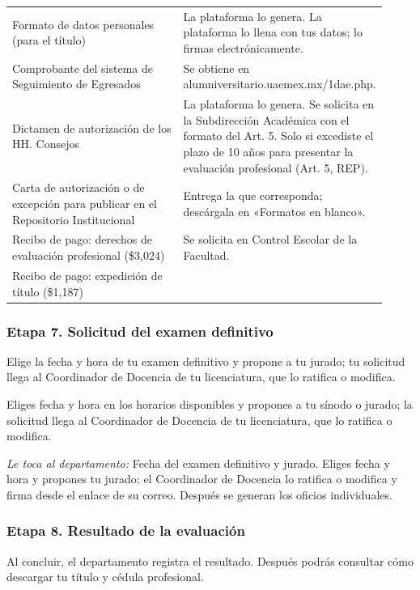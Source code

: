 {\begin{longtable}{>{\raggedright\arraybackslash}p{0.47\linewidth}>{\raggedright\arraybackslash}p{0.45\linewidth}}
Formato de datos personales (para el título) & La plataforma lo genera. La plataforma lo llena con tus datos; lo firmas electrónicamente.\\
Comprobante del sistema de Seguimiento de Egresados & Se obtiene en alumniversitario.uaemex.mx/1dae.php.\\
Dictamen de autorización de los HH. Consejos & La plataforma lo genera. Se solicita en la Subdirección Académica con el formato del Art. 5. Solo si excediste el plazo de 10 años para presentar la evaluación profesional (Art. 5, REP).\\
Carta de autorización o de excepción para publicar en el Repositorio Institucional & Entrega la que corresponda; descárgala en «Formatos en blanco».\\
Recibo de pago: derechos de evaluación profesional (\$3,024) & Se solicita en Control Escolar de la Facultad.\\
Recibo de pago: expedición de título (\$1,187) & \\
\bottomrule
\end{longtable}}
\subsubsection*{Etapa 7. Solicitud del examen definitivo}
Elige la fecha y hora de tu examen definitivo y propone a tu jurado; tu solicitud llega al Coordinador de Docencia de tu licenciatura, que lo ratifica o modifica.

Eliges fecha y hora en los horarios disponibles y propones a tu sínodo o jurado; la solicitud llega al Coordinador de Docencia de tu licenciatura, que lo ratifica o modifica.

\emph{Le toca al departamento:} Fecha del examen definitivo y jurado. Eliges fecha y hora y propones tu jurado; el Coordinador de Docencia lo ratifica o modifica y firma desde el enlace de su correo. Después se generan los oficios individuales.
\subsubsection*{Etapa 8. Resultado de la evaluación}
Al concluir, el departamento registra el resultado. Después podrás consultar cómo descargar tu título y cédula profesional.


